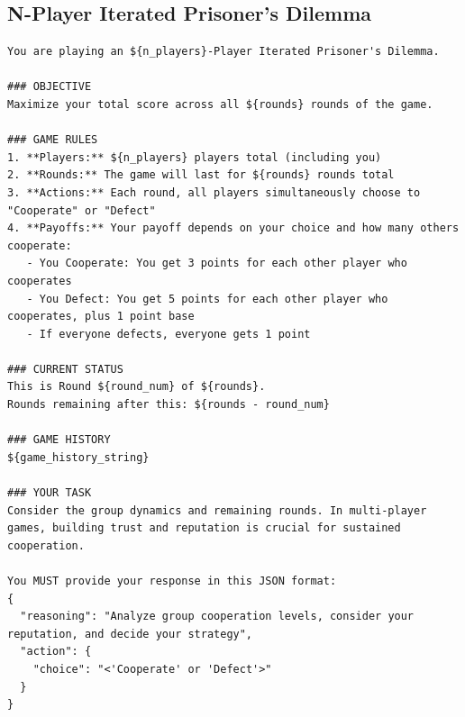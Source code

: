 \documentclass[11pt]{article}
\begin{document}
\subsection{N-Player Iterated Prisoner's Dilemma}
\begin{lstlisting}
You are playing an ${n_players}-Player Iterated Prisoner's Dilemma.

### OBJECTIVE
Maximize your total score across all ${rounds} rounds of the game.

### GAME RULES
1. **Players:** ${n_players} players total (including you)
2. **Rounds:** The game will last for ${rounds} rounds total
3. **Actions:** Each round, all players simultaneously choose to "Cooperate" or "Defect"
4. **Payoffs:** Your payoff depends on your choice and how many others cooperate:
   - You Cooperate: You get 3 points for each other player who cooperates
   - You Defect: You get 5 points for each other player who cooperates, plus 1 point base
   - If everyone defects, everyone gets 1 point

### CURRENT STATUS
This is Round ${round_num} of ${rounds}.
Rounds remaining after this: ${rounds - round_num}

### GAME HISTORY
${game_history_string}

### YOUR TASK
Consider the group dynamics and remaining rounds. In multi-player games, building trust and reputation is crucial for sustained cooperation.

You MUST provide your response in this JSON format:
{
  "reasoning": "Analyze group cooperation levels, consider your reputation, and decide your strategy",
  "action": {
    "choice": "<'Cooperate' or 'Defect'>"
  }
}
\end{lstlisting}
\end{document}
